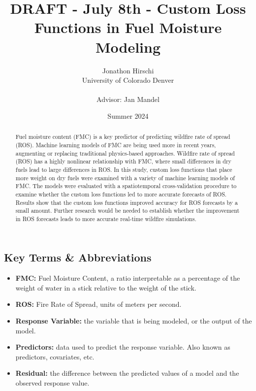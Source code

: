 \documentclass[11pt]{article}%
\begin{document}
\title{DRAFT - July 8th - Custom Loss Functions in Fuel Moisture Modeling}
\author{
    \begin{tabular}[t]{c}
        Jonathon Hirschi \\
        University of Colorado Denver \\
        \\
        Advisor: Jan Mandel
    \end{tabular}
}

\date{Summer 2024}
\maketitle

\begin{abstract}
Fuel moisture content (FMC) is a key predictor of predicting wildfire rate of spread (ROS). Machine learning models of FMC are being used more in recent years, augmenting or replacing traditional physics-based approaches. Wildfire rate of spread (ROS) has a highly nonlinear relationship with FMC, where small differences in dry fuels lead to large differences in ROS. In this study, custom loss functions that place more weight on dry fuels were examined with a variety of machine learning models of FMC. The models were evaluated with a spatiotemporal cross-validation procedure to examine whether the custom loss functions led to more accurate forecasts of ROS. Results show that the custom loss functions improved accuracy for ROS forecasts by a small amount. Further research would be needed to establish whether the improvement in ROS forecasts leads to more accurate real-time wildfire simulations.
\end{abstract}

\subsection*{Key Terms \& Abbreviations}
\begin{itemize}
    \item \textbf{FMC:} Fuel Moisture Content, a ratio interpretable as a percentage of the weight of water in a stick relative to the weight of the stick.
    \item \textbf{ROS:} Fire Rate of Spread, units of meters per second.
    \item \textbf{Response Variable:} the variable that is being modeled, or the output of the model.
    \item \textbf{Predictors:} data used to predict the response variable. Also known as predictors, covariates, etc.
    \item \textbf{Residual:} the difference between the predicted values of a model and the observed response value.
\end{itemize}
\end{document}
